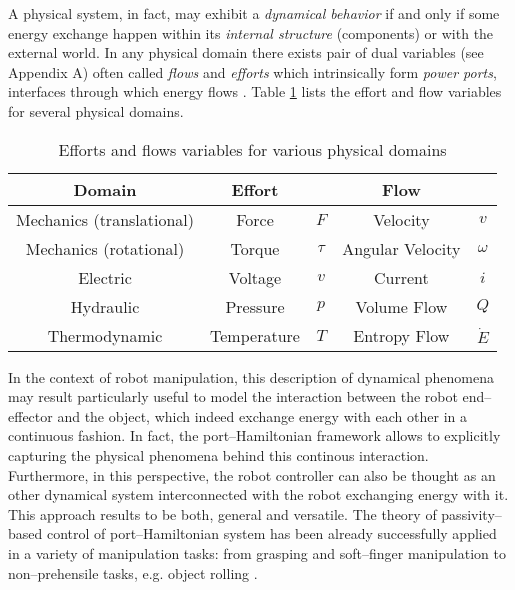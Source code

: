 %
A physical system, in fact, may exhibit a \textit{dynamical behavior} if and only if some energy exchange happen within its \textit{internal structure} (components) or with the external world. In any physical domain there exists pair of dual variables (see Appendix A) often called \textit{flows} and \textit{efforts} which intrinsically form \textit{power ports}, interfaces through which energy flows \cite{secchi2007control}. Table \ref{tab:ef} lists the effort and flow variables for several physical domains.
%
\begin{table}[t]
	\centering
	\begin{tabular}{|c|cc|cc|} \hline
			\rowcolor{gray!50}\textbf{Domain}&{\centering \textbf{Effort}}&&{\centering \textbf{Flow}}&\\\hline
			Mechanics (translational)&Force&$F$&Velocity&$v$\\\hline
			\rowcolor{gray!15}Mechanics (rotational)&Torque &$\tau$&Angular Velocity &$\omega$\\\hline
			Electric&Voltage &$v$&Current &$i$\\\hline
			\rowcolor{gray!15}Hydraulic&Pressure& $p$&Volume Flow &$Q$\\\hline
			Thermodynamic&Temperature &$T$&Entropy Flow &$\dot{E}$\\\hline
	\end{tabular}
	\caption{Efforts and flows variables for various physical domains}
	\label{tab:ef}
\end{table}
%
\newline

In the context of robot manipulation, this description of dynamical phenomena may result particularly useful to model the interaction between the robot end--effector and the object, which indeed exchange energy with each other in a continuous fashion.
%
In fact, the port--Hamiltonian framework allows to explicitly capturing the physical phenomena behind this continous interaction. Furthermore, in this perspective, the robot controller can also be thought as an other dynamical system interconnected with the robot exchanging energy with it. 
This approach results to be both, general and versatile.
%
The theory of passivity--based control of port--Hamiltonian system has been already successfully applied in a variety of manipulation tasks: from grasping \cite{stramigioli99} and soft--finger manipulation \cite{ficuciello2010} to non--prehensile tasks, e.g. object rolling \cite{donaire2017,serra2019}.
%
\newline

